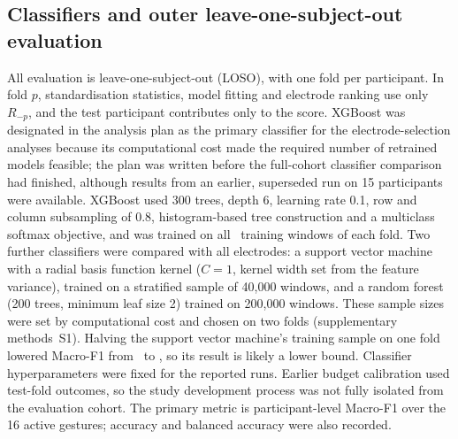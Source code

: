 \subsection{Classifiers and outer leave-one-subject-out evaluation}
All evaluation is leave-one-subject-out (LOSO), with one fold per participant. In fold $p$, standardisation statistics, model fitting and electrode ranking use only $R_{-p}$, and the test participant contributes only to the score. XGBoost was designated in the analysis plan as the primary classifier for the electrode-selection analyses because its computational cost made the required number of retrained models feasible; the plan was written before the full-cohort classifier comparison had finished, although results from an earlier, superseded run on 15 participants were available. XGBoost used 300 trees, depth 6, learning rate 0.1, row and column subsampling of 0.8, histogram-based tree construction and a multiclass softmax objective, and was trained on all \FoldTrainingWindows\ training windows of each fold. Two further classifiers were compared with all electrodes: a support vector machine with a radial basis function kernel ($C = 1$, kernel width set from the feature variance), trained on a stratified sample of 40,000 windows, and a random forest (200 trees, minimum leaf size 2) trained on 200,000 windows. These sample sizes were set by computational cost and chosen on two folds (supplementary methods~S1). Halving the support vector machine's training sample on one fold lowered Macro-F1 from \SVMCalibFortyK\ to \SVMCalibTwentyK, so its result is likely a lower bound. Classifier hyperparameters were fixed for the reported runs. Earlier budget calibration used test-fold outcomes, so the study development process was not fully isolated from the evaluation cohort. The primary metric is participant-level Macro-F1 over the 16 active gestures; accuracy and balanced accuracy were also recorded.

